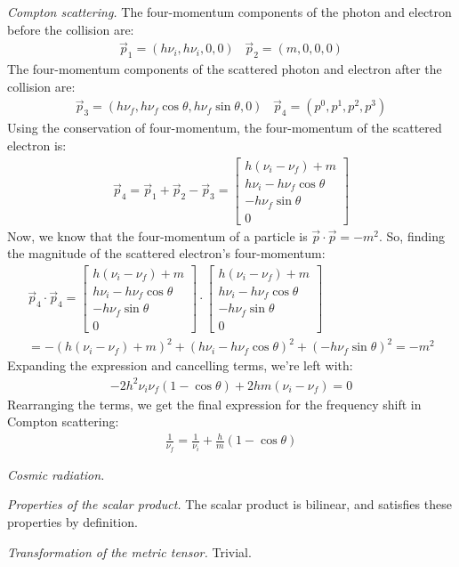\documentclass{report}
\begin{document}
\begin{subquests}
	\item \emph{Compton scattering.}
	The four-momentum components of the photon and electron before the collision are:
	\begin{gather*}
		\vec p_1 = (h\nu_i, h\nu_i, 0, 0) \;\;\; \vec p_2 = (m, 0, 0, 0)
	\end{gather*}
	The four-momentum components of the scattered photon and electron after the collision are:
	\begin{gather*}
		\vec p_3 = (h\nu_f, h\nu_f \cos\theta, h\nu_f \sin\theta, 0) \;\;\; \vec p_4 = (p^0, p^1, p^2, p^3)
	\end{gather*}
	Using the conservation of four-momentum, the four-momentum of the scattered electron is:
	\begin{gather*}
		\vec p_4 = \vec p_1 + \vec p_2 - \vec p_3 =
		\begin{bmatrix}
			h(\nu_i - \nu_f) + m \\
			h\nu_i - h\nu_f \cos\theta \\
			-h\nu_f \sin\theta \\
			0
		\end{bmatrix}
	\end{gather*}
	Now, we know that the four-momentum of a particle is $\vec p \cdot \vec p = -m^2$. So, finding the magnitude of the scattered electron's four-momentum:
	\begin{gather*}
		{\vec p}_4 \cdot {\vec p}_4 =
		\begin{bmatrix}
			h(\nu_i - \nu_f) + m \\
			h\nu_i - h\nu_f \cos\theta \\
			-h\nu_f \sin\theta \\
			0
		\end{bmatrix} \cdot
		\begin{bmatrix}
			h(\nu_i - \nu_f) + m \\
			h\nu_i - h\nu_f \cos\theta \\
			-h\nu_f \sin\theta \\
			0
		\end{bmatrix} \\
		= -(h(\nu_i - \nu_f) + m)^2 + (h\nu_i - h\nu_f \cos\theta)^2 + (-h\nu_f \sin\theta)^2 = -m^2
	\end{gather*}
	Expanding the expression and cancelling terms, we're left with:
	\begin{gather*}
		-2h^2\nu_i \nu_f (1-\cos\theta) + 2hm(\nu_i - \nu_f) = 0
	\end{gather*}
	Rearranging the terms, we get the final expression for the frequency shift in Compton scattering:
	\begin{gather*}
		\frac{1}{\nu_f} = \frac{1}{\nu_i} + \frac{h}{m}(1-\cos\theta)
	\end{gather*}

	\item \emph{Cosmic radiation.}

	\item \emph{Properties of the scalar product.} The scalar product is bilinear, and satisfies these properties by definition.

	\item \emph{Transformation of the metric tensor.} Trivial.
\end{subquests}
\end{document}
